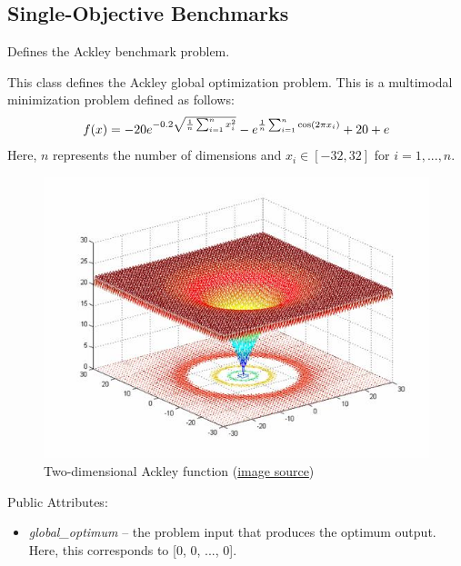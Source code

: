 \documentclass[letterpaper,10pt,english]{sphinxmanual}
\begin{document}
\subsection{Single-Objective Benchmarks}
\label{reference:single-objective-benchmarks}

\begin{fulllineitems}
\label{reference:inspyred.benchmarks.Ackley}
Defines the Ackley benchmark problem.

This class defines the Ackley global optimization problem. This 
is a multimodal minimization problem defined as follows:
\begin{gather}
\begin{split}f(x) = -20e^{-0.2\sqrt{\frac{1}{n} \sum_{i=1}^n x_i^2}} - e^{\frac{1}{n} \sum_{i=1}^n \cos(2 \pi x_i)} + 20 + e\end{split}\notag
\end{gather}
Here, $n$ represents the number of dimensions and $x_i \in [-32, 32]$ for $i=1,...,n$.
\begin{figure}[htbp]
\centering
\capstart

\includegraphics{image6011.jpg}
\caption{Two-dimensional Ackley function 
(\href{http://www-optima.amp.i.kyoto-u.ac.jp/member/student/hedar/Hedar\_files/TestGO\_files/Page295.htm}{image source})}\end{figure}

Public Attributes:
\begin{itemize}
\item {} 
\emph{global\_optimum} -- the problem input that produces the optimum output.
Here, this corresponds to {[}0, 0, ..., 0{]}.

\end{itemize}

\end{fulllineitems}
\end{document}
